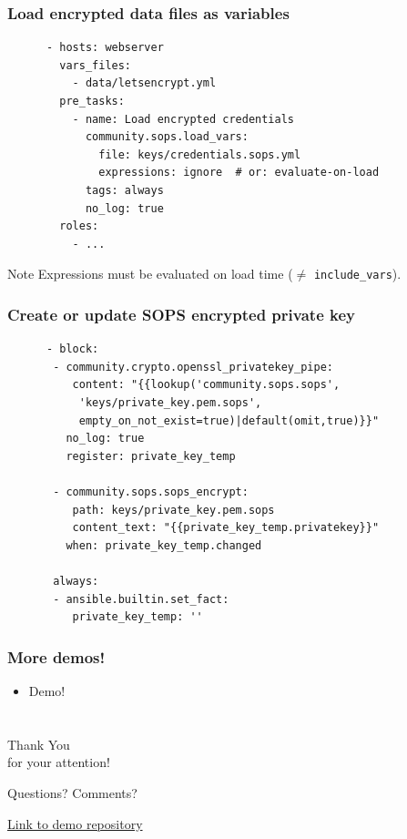 \documentclass{beamer}
\begin{document}
  \begin{frame}[fragile,t]
    \frametitle{Load encrypted data files as variables}
    \begin{verbatim}
      - hosts: webserver
        vars_files:
          - data/letsencrypt.yml
        pre_tasks:
          - name: Load encrypted credentials
            community.sops.load_vars:
              file: keys/credentials.sops.yml
              expressions: ignore  # or: evaluate-on-load
            tags: always
            no_log: true
        roles:
          - ...
    \end{verbatim}
    \begin{block}{Note}
      Expressions must be evaluated on load time ($\neq$ \lstinline{include_vars}).
    \end{block}
  \end{frame}

  \begin{frame}[fragile,t]
    \frametitle{Create or update SOPS encrypted private key}
    \vspace{-2ex}
    \begin{verbatim}
      - block:
       - community.crypto.openssl_privatekey_pipe:
          content: "{{lookup('community.sops.sops',
           'keys/private_key.pem.sops',
           empty_on_not_exist=true)|default(omit,true)}}"
         no_log: true
         register: private_key_temp

       - community.sops.sops_encrypt:
          path: keys/private_key.pem.sops
          content_text: "{{private_key_temp.privatekey}}"
         when: private_key_temp.changed

       always:
       - ansible.builtin.set_fact:
          private_key_temp: ''
    \end{verbatim}
  \end{frame}

  \begin{frame}[fragile]
    \frametitle{More demos!}
    \begin{itemize}
      \item Demo!
    \end{itemize}
  \end{frame}

  \section*{}
  \begin{frame}
    \begin{center}
      \Huge Thank You\\
      for your attention!

      \vspace{1.5cm}

      \LARGE Questions? Comments?
      
      \vspace{1.5cm}
      
      \small \href{https://github.com/felixfontein/ansible-meetup-20230912-zurich-demo}{Link to demo repository}
    \end{center}
  \end{frame}
\end{document}
